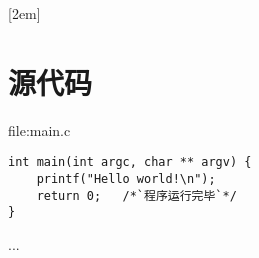 
[2em]{\vspace{.2\baselineskip}\bf\xiaosi\song}
             {\prechaptername\CJKnumber{\thecontentslabel}\postchaptername\qquad}{}{}             							%
\setcounter{page}{1}    	%

\chapter*{源代码}
\noindent
file:main.c
\begin{lstlisting}
int main(int argc, char ** argv) {
    printf("Hello world!\n");
    return 0;	/*`程序运行完毕`*/
}
\end{lstlisting}

...
